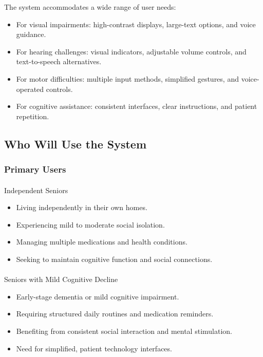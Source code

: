 \documentclass[
  letterpaper,
  DIV=11,
  numbers=noendperiod]{scrartcl}
\makeatletter
\let\oldparagraph\paragraph
\renewcommand{\paragraph}{
    \@ifstar
      \xxxParagraphStar
      \xxxParagraphNoStar
  }
\newcommand{\xxxParagraphStar}[1]{\oldparagraph*{#1}\mbox{}}
\newcommand{\xxxParagraphNoStar}[1]{\oldparagraph{#1}\mbox{}}
\providecommand{\tightlist}{%
  \setlength{\itemsep}{0pt}\setlength{\parskip}{0pt}}\usepackage{longtable,booktabs,array}
\makeatother
\begin{document}
The system accommodates a wide range of user needs:

\begin{itemize}
\tightlist
\item
  For visual impairments: high-contrast displays, large-text options,
  and voice guidance.
\item
  For hearing challenges: visual indicators, adjustable volume controls,
  and text-to-speech alternatives.
\item
  For motor difficulties: multiple input methods, simplified gestures,
  and voice-operated controls.
\item
  For cognitive assistance: consistent interfaces, clear instructions,
  and patient repetition.
\end{itemize}

\subsection{Who Will Use the System}\label{who-will-use-the-system}

\subsubsection{Primary Users}\label{primary-users}

\paragraph{Independent Seniors}\label{independent-seniors}

\begin{itemize}
\tightlist
\item
  Living independently in their own homes.
\item
  Experiencing mild to moderate social isolation.
\item
  Managing multiple medications and health conditions.
\item
  Seeking to maintain cognitive function and social connections.
\end{itemize}

\paragraph{Seniors with Mild Cognitive
Decline}\label{seniors-with-mild-cognitive-decline}

\begin{itemize}
\tightlist
\item
  Early-stage dementia or mild cognitive impairment.
\item
  Requiring structured daily routines and medication reminders.
\item
  Benefiting from consistent social interaction and mental stimulation.
\item
  Need for simplified, patient technology interfaces.
\end{itemize}
\end{document}
